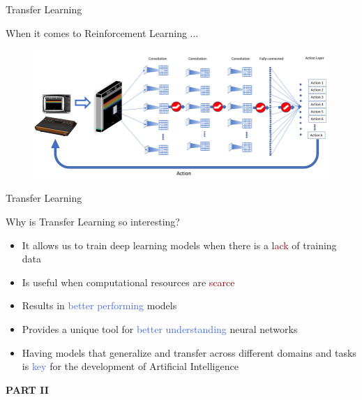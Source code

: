 \documentclass{beamer}
\begin{document}
\begin{frame}{Transfer Learning}

	When it comes to Reinforcement Learning ...
	\bigskip

	\begin{figure}
		\includegraphics[width=1\textwidth]{figures/dqn}
	\end{figure}

\end{frame}



\begin{frame}{Transfer Learning}

	Why is Transfer Learning so interesting?

	\begin{itemize}
		\item It allows us to train deep learning models when there is a \textcolor{Maroon}{lack} of training data
		\item Is useful when computational resources are \textcolor{Maroon}{scarce}
		\item Results in \textcolor{RoyalBlue}{better performing} models
		\item Provides a unique tool for \textcolor{RoyalBlue}{better understanding} neural networks  
		\item Having models that generalize and transfer across different domains and tasks is \textcolor{RoyalBlue}{key} for the development of Artificial Intelligence 
	\end{itemize}


\end{frame}


\begin{frame}
	\begin{center}
		\textcolor{skymagenta}{\textbf{PART II}}
	\end{center}
\end{frame}
\end{document}
